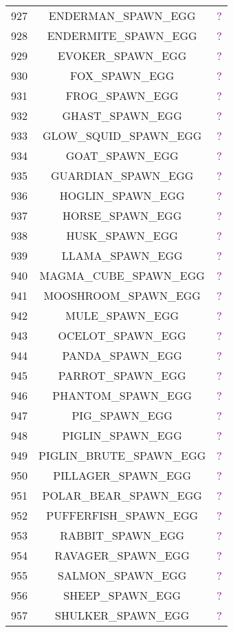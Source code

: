 \documentclass[11pt]{article}
\newcommand\myworries[1]{\textcolor{purple}{#1}}
\begin{document}
\begin{longtable}{ |c|c|c| }
	927 & ENDERMAN\_SPAWN\_EGG & \myworries{?} \\
	928 & ENDERMITE\_SPAWN\_EGG & \myworries{?} \\
	929 & EVOKER\_SPAWN\_EGG & \myworries{?} \\
	930 & FOX\_SPAWN\_EGG & \myworries{?} \\
	931 & FROG\_SPAWN\_EGG & \myworries{?} \\
	932 & GHAST\_SPAWN\_EGG & \myworries{?} \\
	933 & GLOW\_SQUID\_SPAWN\_EGG & \myworries{?} \\
	934 & GOAT\_SPAWN\_EGG & \myworries{?} \\
	935 & GUARDIAN\_SPAWN\_EGG & \myworries{?} \\
	936 & HOGLIN\_SPAWN\_EGG & \myworries{?} \\
	937 & HORSE\_SPAWN\_EGG & \myworries{?} \\
	938 & HUSK\_SPAWN\_EGG & \myworries{?} \\
	939 & LLAMA\_SPAWN\_EGG & \myworries{?} \\
	940 & MAGMA\_CUBE\_SPAWN\_EGG & \myworries{?} \\
	941 & MOOSHROOM\_SPAWN\_EGG & \myworries{?} \\
	942 & MULE\_SPAWN\_EGG & \myworries{?} \\
	943 & OCELOT\_SPAWN\_EGG & \myworries{?} \\
	944 & PANDA\_SPAWN\_EGG & \myworries{?} \\
	945 & PARROT\_SPAWN\_EGG & \myworries{?} \\
	946 & PHANTOM\_SPAWN\_EGG & \myworries{?} \\
	947 & PIG\_SPAWN\_EGG & \myworries{?} \\
	948 & PIGLIN\_SPAWN\_EGG & \myworries{?} \\
	949 & PIGLIN\_BRUTE\_SPAWN\_EGG & \myworries{?} \\
	950 & PILLAGER\_SPAWN\_EGG & \myworries{?} \\
	951 & POLAR\_BEAR\_SPAWN\_EGG & \myworries{?} \\
	952 & PUFFERFISH\_SPAWN\_EGG & \myworries{?} \\
	953 & RABBIT\_SPAWN\_EGG & \myworries{?} \\
	954 & RAVAGER\_SPAWN\_EGG & \myworries{?} \\
	955 & SALMON\_SPAWN\_EGG & \myworries{?} \\
	956 & SHEEP\_SPAWN\_EGG & \myworries{?} \\
	957 & SHULKER\_SPAWN\_EGG & \myworries{?} \\

\end{longtable}
\end{document}
